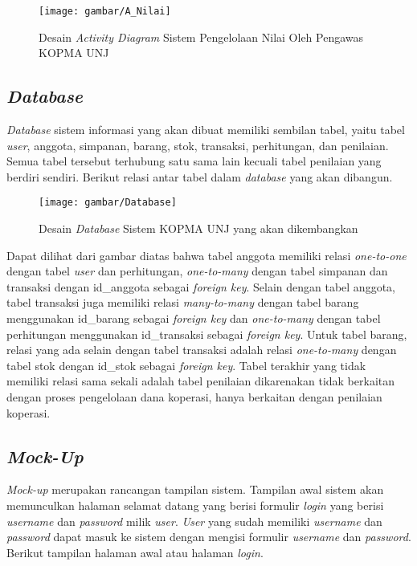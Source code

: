 \begin{figure}[H]
	\centering
	\texttt{[image: gambar/A\_Nilai]}
	\caption{Desain \emph{Activity Diagram} Sistem Pengelolaan Nilai Oleh Pengawas KOPMA UNJ}
\end{figure}

\subsection{\emph{Database}}
\emph{Database} sistem informasi yang akan dibuat memiliki sembilan tabel, yaitu tabel \emph{user}, anggota, simpanan, barang, stok, transaksi, perhitungan, dan penilaian. Semua tabel tersebut terhubung satu sama lain kecuali tabel penilaian yang berdiri sendiri. Berikut relasi antar tabel dalam \emph{database} yang akan dibangun. 

\begin{figure}[H]
	\centering
	\texttt{[image: gambar/Database]}
	\caption{Desain \emph{Database} Sistem KOPMA UNJ yang akan dikembangkan}
\end{figure}

Dapat dilihat dari gambar diatas bahwa tabel anggota memiliki relasi \textit{one-to-one} dengan tabel \textit{user} dan perhitungan, \textit{one-to-many} dengan tabel simpanan dan transaksi dengan id\_anggota sebagai \textit{foreign key}. Selain dengan tabel anggota, tabel transaksi juga memiliki relasi \textit{many-to-many} dengan tabel barang menggunakan id\_barang sebagai \textit{foreign key} dan \textit{one-to-many} dengan tabel perhitungan menggunakan id\_transaksi sebagai \textit{foreign key}. Untuk tabel barang, relasi yang ada selain dengan tabel transaksi adalah relasi \textit{one-to-many} dengan tabel stok dengan id\_stok sebagai \textit{foreign key}. Tabel terakhir yang tidak memiliki relasi sama sekali adalah tabel penilaian dikarenakan tidak berkaitan dengan proses pengelolaan dana koperasi, hanya berkaitan dengan penilaian koperasi.

\subsection{\emph{Mock-Up}}
\emph{Mock-up} merupakan rancangan tampilan sistem. Tampilan awal sistem akan memunculkan halaman selamat datang yang berisi formulir \emph{login} yang berisi \emph{username} dan \emph{password} milik \emph{user}. \emph{User} yang sudah memiliki \emph{username} dan \emph{password} dapat masuk ke sistem dengan mengisi formulir \emph{username} dan \emph{password}. Berikut tampilan halaman awal atau halaman \emph{login}. 

